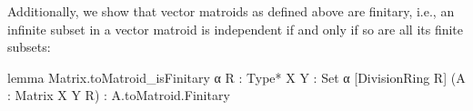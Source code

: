 Additionally, we show that vector matroids as defined above are finitary, i.e., an infinite subset in a vector matroid is independent if and only if so are all its finite subsets:
\begin{leancode}
lemma Matrix.toMatroid_isFinitary {α R : Type*}
    {X Y : Set α} [DivisionRing R]
    (A : Matrix X Y R) :
    A.toMatroid.Finitary
\end{leancode}

